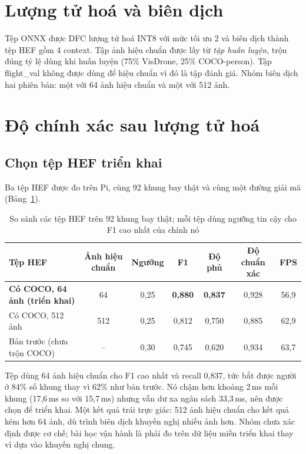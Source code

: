 \section{Lượng tử hoá và biên dịch}

Tệp ONNX được DFC lượng tử hoá INT8 với mức tối ưu 2 và biên dịch thành tệp HEF gồm 4 context. Tập ảnh hiệu chuẩn được lấy từ \textit{tập huấn luyện}, trộn đúng tỷ lệ dùng khi huấn luyện (75\% VisDrone, 25\% COCO-person). Tập flight\_val không được dùng để hiệu chuẩn vì đó là tập đánh giá. Nhóm biên dịch hai phiên bản: một với 64 ảnh hiệu chuẩn và một với 512 ảnh.

\section{Độ chính xác sau lượng tử hoá}
\label{sec:int8}

\subsection{Chọn tệp HEF triển khai}
\label{sec:chonhef}

Ba tệp HEF được đo trên Pi, cùng 92 khung bay thật và cùng một đường giải mã (Bảng~\ref{tab:hef}).

\begin{table}[H]
\centering
\caption{So sánh các tệp HEF trên 92 khung bay thật; mỗi tệp dùng ngưỡng tin cậy cho F1 cao nhất của chính nó}
\label{tab:hef}
\small
\renewcommand{\arraystretch}{1.15}
\begin{tabularx}{\textwidth}{@{}>{\raggedright\arraybackslash}Xcccccc@{}}
\toprule
\textbf{Tệp HEF} & \textbf{Ảnh hiệu chuẩn} & \textbf{Ngưỡng} & \textbf{F1} & \textbf{Độ phủ} & \textbf{Độ chuẩn xác} & \textbf{FPS}\\
\midrule
\textbf{Có COCO, 64 ảnh (triển khai)} & 64 & 0,25 & \textbf{0,880} & \textbf{0,837} & 0,928 & 56,9\\
Có COCO, 512 ảnh & 512 & 0,25 & 0,812 & 0,750 & 0,885 & 62,9\\
Bản trước (chưa trộn COCO) & -- & 0,30 & 0,745 & 0,620 & 0,934 & 63,7\\
\bottomrule
\end{tabularx}
\end{table}

Tệp dùng 64 ảnh hiệu chuẩn cho F1 cao nhất và recall 0,837, tức bắt được người ở 84\% số khung thay vì 62\% như bản trước. Nó chậm hơn khoảng 2\,ms mỗi khung (17,6\,ms so với 15,7\,ms) nhưng vẫn dư xa ngân sách 33,3\,ms, nên được chọn để triển khai. Một kết quả trái trực giác: 512 ảnh hiệu chuẩn cho kết quả kém hơn 64 ảnh, dù trình biên dịch khuyến nghị nhiều ảnh hơn. Nhóm chưa xác định được cơ chế; bài học vận hành là phải đo trên dữ liệu miền triển khai thay vì dựa vào khuyến nghị chung.

